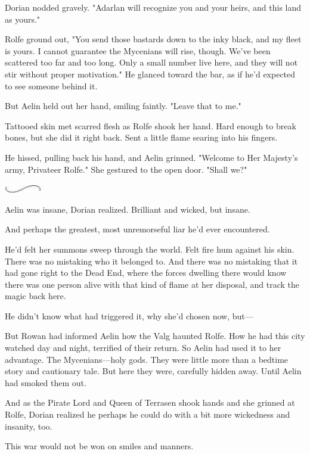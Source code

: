 Dorian nodded gravely. "Adarlan will recognize you and your heirs, and this land as yours."

Rolfe ground out, "You send those bastards down to the inky black, and my fleet is yours. I cannot guarantee the Mycenians will rise, though. We've been scattered too far and too long. Only a small number live here, and they will not stir without proper  motivation." He glanced toward the bar, as if he'd expected to see someone behind it.

But Aelin held out her hand, smiling faintly. "Leave that to me."

Tattooed skin met scarred flesh as Rolfe shook her hand. Hard enough to break bones, but she did it right back. Sent a little flame searing into his fingers.

He hissed, pulling back his hand, and Aelin grinned. "Welcome to Her Majesty's army, Privateer Rolfe." She gestured to the open door. "Shall we?"

\includegraphics[width=0.65in,height=0.13in]{images/seperator}

Aelin was insane, Dorian realized. Brilliant and wicked, but insane.

And perhaps the greatest, most unremorseful liar he'd ever encountered.

He'd felt her summons sweep through the world. Felt fire hum against his skin. There was no mistaking who it belonged to. And there was no mistaking that it had gone right to the Dead End, where the forces dwelling there would know there was one person alive with that kind of flame at her disposal, and track the magic back here.

He didn't know what had triggered it, why she'd chosen now, but---

But Rowan had informed Aelin how the Valg haunted Rolfe. How he had this city watched day and night, terrified of their return. So Aelin had used it to her advantage. The Mycenians---holy gods. They were little more than a bedtime story and cautionary tale. But here they were, carefully hidden away. Until Aelin had smoked them out.

And as the Pirate Lord and Queen of Terrasen shook hands and she grinned at Rolfe, Dorian realized he  perhaps he could do with a bit more wickedness and insanity, too.

This war would not be won on smiles and manners.

